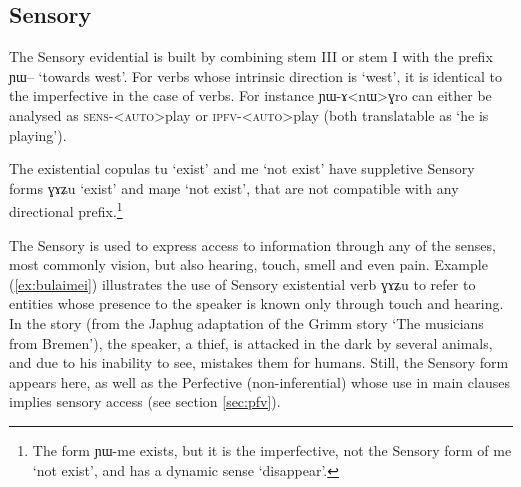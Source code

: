 \documentclass[oldfontcommands,oneside,a4paper,11pt]{article}
\newcommand{\ipa}[1]{{\phon \mbox{#1}}} %
\newcommand{\refb}[1]{(\ref{#1})}
\begin{document}
 \subsection{Sensory } \label{sec:sens}
The Sensory evidential is built by combining stem III or stem I with the prefix \ipa{ɲɯ--} `towards west'.  For verbs whose intrinsic direction is `west', it is identical to the imperfective in the case of verbs. For instance \ipa{ɲɯ-ɤ<nɯ>ɣro} can either be analysed as \textsc{sens-<auto>}play or \textsc{ipfv-<auto>}play (both translatable as `he is playing').

The existential copulas \ipa{tu} `exist' and \ipa{me} `not exist' have suppletive Sensory forms \ipa{ɣɤʑu} `exist'  and \ipa{maŋe} `not exist', that are not compatible with any directional prefix.\footnote{The form \ipa{ɲɯ-me} exists, but it is the imperfective, not the Sensory form of \ipa{me} `not exist', and has a dynamic sense `disappear'. }

The Sensory is used to express access to information through any of the senses, most commonly vision, but also hearing, touch, smell and even pain. Example \refb{ex:bulaimei}  illustrates the use of Sensory existential verb \ipa{ɣɤʑu} to refer to entities whose presence to the speaker is known only through touch and hearing. In the story (from the Japhug adaptation of the Grimm story `The musicians from Bremen'), the speaker, a thief, is attacked in the dark by several animals, and due to his inability to see, mistakes them for humans. Still, the Sensory form appears here, as well as the Perfective (non-inferential) whose use in main clauses implies sensory access (see section \ref{sec:pfv}).
\end{document}

